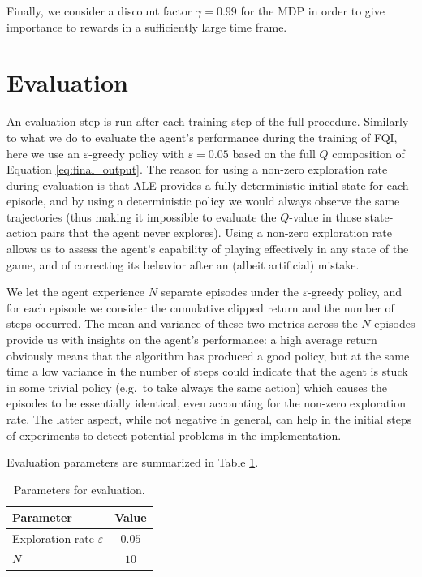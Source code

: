 Finally, we consider a discount factor $\gamma = 0.99$ for the MDP in order to 
give importance to rewards in a sufficiently large time frame. 

\section{Evaluation}
An evaluation step is run after each training step of the full procedure.
Similarly to what we do to evaluate the agent's performance during the training
of FQI, here we use an $\varepsilon$-greedy policy with $\varepsilon = 0.05$ 
based on the full $Q$ composition of Equation \eqref{eq:final_output}.
The reason for using a non-zero exploration rate during evaluation is that ALE
provides a fully deterministic initial state for each episode, and by using a 
deterministic policy we would always observe the same trajectories (thus making
it impossible to evaluate the $Q$-value in those state-action pairs that
the agent never explores). Using a non-zero exploration rate allows us to 
assess the agent's capability of playing effectively in any state of the game, 
and of correcting its behavior after an (albeit artificial) mistake.

We let the agent experience $N$ separate episodes under the $\varepsilon$-greedy 
policy, and for each episode we consider the cumulative clipped return and the
number of steps occurred. The mean and variance of these two metrics across the 
$N$ episodes provide us with insights on the agent's performance: a high average 
return obviously means that the algorithm has produced a good policy, but at the
same time a low variance in the number of steps could indicate that the agent is 
stuck in some trivial policy (e.g.\ to take always the same action) which causes 
the episodes to be essentially identical, even accounting for the non-zero 
exploration rate. The latter aspect, while not negative in general, can help in 
the initial steps of experiments to detect potential problems in the 
implementation.

Evaluation parameters are summarized in Table \ref{t:eval}.
%
\begin{table}[h]
    \centering
    \begin{tabular}{l c} 
	\hline
	Parameter                      & Value  \\ 
	\hline 
	Exploration rate $\varepsilon$ & $0.05$ \\
	$N$                            & $10$   \\
	\hline
    \end{tabular}
    \caption[Parameters for evaluation]{Parameters for evaluation.}
    \label{t:eval}
\end{table}
%
